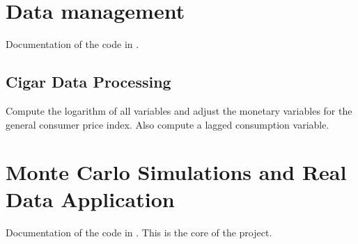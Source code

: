 \documentclass[a4paper,11pt,english]{sphinxmanual}
\begin{document}
\chapter{Data management}
\label{\detokenize{data_management:data-management}}\label{\detokenize{data_management:id1}}\label{\detokenize{data_management::doc}}
\sphinxAtStartPar
Documentation of the code in .


\section{Cigar Data Processing}
\label{\detokenize{data_management:module-src.data_management.task_get_cigar_data}}\label{\detokenize{data_management:cigar-data-processing}}
\sphinxAtStartPar
Compute the logarithm of all variables and adjust the monetary variables for the general
consumer price index. Also compute a lagged consumption variable.


\chapter{Monte Carlo Simulations and Real Data Application}
\label{\detokenize{analysis:monte-carlo-simulations-and-real-data-application}}\label{\detokenize{analysis:id1}}\label{\detokenize{analysis::doc}}
\sphinxAtStartPar
Documentation of the code in . This is the core of the project.
\end{document}
